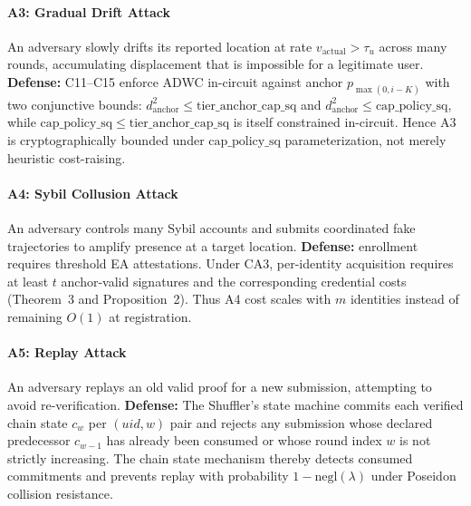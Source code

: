 \documentclass[conference]{IEEEtran}
\theoremstyle{definition}
\theoremstyle{plain}
\begin{document}
\paragraph{A3: Gradual Drift Attack}
An adversary slowly drifts its reported location at rate
$v_{\mathrm{actual}} > \tau_u$
across many rounds, accumulating displacement that is impossible for a legitimate user.
\textbf{Defense:} C11--C15 enforce ADWC in-circuit against anchor
$p_{\max(0,i-K)}$ with two conjunctive bounds:
$d_{\mathrm{anchor}}^2 \le \mathrm{tier\_anchor\_cap\_sq}$ and
$d_{\mathrm{anchor}}^2 \le \mathrm{cap\_policy\_sq}$, while
$\mathrm{cap\_policy\_sq}\le\mathrm{tier\_anchor\_cap\_sq}$ is itself
constrained in-circuit.
Hence A3 is cryptographically bounded under
$\mathrm{cap\_policy\_sq}$ parameterization, not merely heuristic
cost-raising.

\paragraph{A4: Sybil Collusion Attack}
An adversary controls many Sybil accounts and submits coordinated fake
trajectories to amplify presence at a target location.
\textbf{Defense:} enrollment requires threshold EA attestations. Under CA3,
per-identity acquisition requires at least $t$ anchor-valid signatures and
the corresponding credential costs (Theorem~3 and Proposition~2). Thus A4
cost scales with $m$ identities instead of remaining $O(1)$ at registration.

\paragraph{A5: Replay Attack}
An adversary replays an old valid proof for a new submission, attempting to avoid re-verification. \textbf{Defense:} The Shuffler's state machine commits each verified chain state $c_w$ per $(\mathit{uid}, w)$ pair and rejects any submission whose declared predecessor $c_{w-1}$ has already been consumed or whose round index $w$ is not strictly increasing. The chain state mechanism thereby detects consumed commitments and prevents replay with probability $1 - \mathrm{negl}(\lambda)$ under Poseidon collision resistance.
\end{document}
